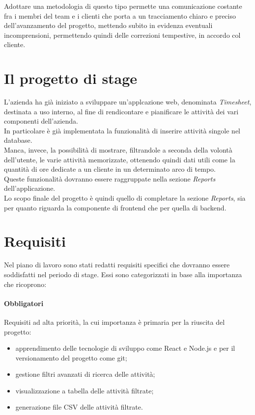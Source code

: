 \noindent Adottare una metodologia di questo tipo permette una comunicazione costante fra i membri del team e i clienti che porta a un tracciamento chiaro e preciso dell'avanzamento del progetto, mettendo subito in evidenza eventuali incomprensioni, permettendo quindi delle correzioni tempestive, in accordo col cliente.

\section{Il progetto di stage}
\label{sec:progettostage}
L'azienda ha già iniziato a sviluppare un'applcazione web, denominata \emph{Timesheet}, destinata a uso interno, al fine di rendicontare e pianificare le attività dei vari componenti dell'azienda. \\
In particolare è già implementata la funzionalità di inserire attività singole nel database. \\
Manca, invece, la possibilità di mostrare, filtrandole a seconda della volontà dell'utente, le varie attività memorizzate, ottenendo quindi dati utili come la quantità di ore dedicate a un cliente in un determinato arco di tempo. \\
Queste funzionalità dovranno essere raggruppate nella sezione \emph{Reports} dell'applicazione. \\
Lo scopo finale del progetto è quindi quello di completare la sezione \emph{Reports}, sia per quanto riguarda la componente di frontend che per quella di backend.

\section{Requisiti}
\label{sec:requisiti}
Nel piano di lavoro sono stati redatti requisiti specifici che dovranno essere soddisfatti nel periodo di stage. Essi sono categorizzati in base alla importanza che ricoprono:


\paragraph{Obbligatori} Requisiti ad alta priorità, la cui importanza è primaria per la riuscita del progetto:

\begin{itemize}
  \item apprendimento delle tecnologie di sviluppo come React e Node.js e per il versionamento del progetto come git;
  \item gestione filtri avanzati di ricerca delle attività;
  \item visualizzazione a tabella delle attività filtrate;
  \item generazione file CSV delle attività filtrate.
\end{itemize}

